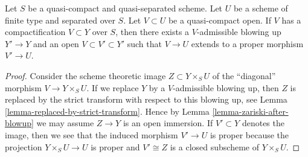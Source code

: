 \begin{lemma}
\label{lemma-compactification-dominates}
Let $S$ be a quasi-compact and quasi-separated scheme. Let $U$ be a
scheme of finite type and separated over $S$. Let $V \subset U$ be a
quasi-compact open. If $V$ has a compactification $V \subset Y$
over $S$, then there exists a $V$-admissible blowing up $Y' \to Y$ and an
open $V \subset V' \subset Y'$ such that $V \to U$
extends to a proper morphism $V' \to U$.
\end{lemma}

\begin{proof}
Consider the scheme theoretic image $Z \subset Y \times_S U$
of the ``diagonal'' morphism $V \to Y \times_S U$. If we replace
$Y$ by a $V$-admissible blowing up, then $Z$ is replaced by
the strict transform with respect to this blowing up, see
Lemma \ref{lemma-replaced-by-strict-transform}. Hence by
Lemma \ref{lemma-zariski-after-blowup} we may assume $Z \to Y$
is an open immersion. If $V' \subset Y$ denotes the image, then we
see that the induced morphism $V' \to U$ is proper because the
projection $Y \times_S U \to U$ is proper and $V' \cong Z$
is a closed subscheme of $Y \times_S U$.
\end{proof}
